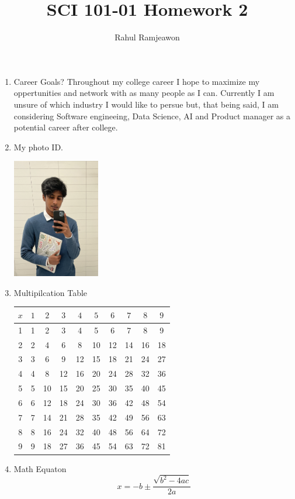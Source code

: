 \documentclass[11pt]{article}
\begin{document}
\title{SCI 101-01 Homework 2}
\author{Rahul Ramjeawon}
\maketitle
\begin{enumerate}
\item Career Goals?
\newline
\rm Throughout my college career I hope to maximize my oppertunities and network with as many people as I can.  Currently I am unsure of which industry I would like to persue but,  that being said,  I am considering Software engineeing,  Data Science,  AI and Product manager as a potential career after college. 
\newline

\item My photo ID. \newline

\includegraphics[width=1.5in]{ID.jpg}
\newline

\item Multipilcation Table
\newline
\newline
\begin{tabular}{|c|c|c|c|c|c|c|c|c|c|}
\hline
$x$	&$1$ &$2$	&$3$	&$4$ &$5$ &$6$ &$7$ &$8$  &$9$ \\ \hline
1	&1	&2	&3 &4  &5   &6 &7 &8 &9\\ \hline
2	&2	&4	&6	&8  &10  &12 &14 &16 &18\\ \hline
3	&3	&6	&9	&12  &15 &18 &21 &24 &27\\ \hline
4	&4	&8	&12	&16  &20 &24 &28 &32 &36\\ \hline
5	&5	&10	&15	&20  &25 &30 &35 &40 &45\\ \hline
6	&6	&12	&18	&24  &30 &36 &42 &48 &54\\ \hline
7	&7	&14	&21	&28  &35 &42 &49 &56 &63\\ \hline
8	&8	&16	&24	&32  &40 &48 &56 &64 &72\\ \hline
9	&9	&18	&27	&36  &45 &54 &63 &72 &81\\ \hline
\end{tabular}
\newline
\item Math Equaton 
\newline
\[x=-b\pm {\frac{\sqrt {b^2-4ac}} {2a} }\] 


\end{enumerate}
\end{document}
